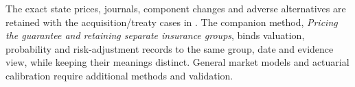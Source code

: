 The exact state prices, journals, component changes and adverse alternatives
are retained with the acquisition/treaty cases in
\allowbreak{}.
The companion method, \emph{Pricing the guarantee and retaining separate
insurance groups}, binds valuation, probability and risk-adjustment records to the same group,
date and evidence view, while keeping their meanings distinct. General market
models and actuarial calibration require additional methods and validation.

